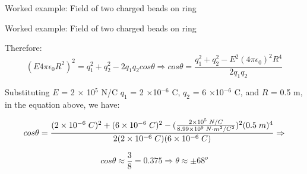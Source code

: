 {\begin{frame}{Worked example: Field of two charged beads on ring}
\end{frame}

%
%
%

\begin{frame}{Worked example: Field of two charged beads on ring}

  Therefore:
  \begin{equation*}
      (E 4\pi\epsilon_0 R^2)^2 = q_1^2 + q_2^2 - 2 q_1 q_2 cos\theta \Rightarrow
      cos\theta = \frac{q_1^2 + q_2^2 - E^2 (4\pi\epsilon_0)^2 R^4}{2 q_1 q_2}
  \end{equation*}

  Substituting
  $E$ = 2 $\times$ 10$^{5}$ N/C
  $q_1$ = 2 $\times$10$^{-6}$ C,
  $q_2$ = 6 $\times$10$^{-6}$ C, and
  $R$ = 0.5 m,
  in the equation above, we have:

  \begin{equation*}
    \small
      cos\theta =
  		  \frac{(2 \times 10^{-6} \; C)^2 + (6 \times 10^{-6} \; C)^2 -
  			      (\frac{2 \times 10^{5} \; N/C}{8.99 \times 10^{9} \; N \cdot m^2/C^2})^2 (0.5 \; m)^4}
  					 {2 (2 \times 10^{-6} \; C) (6 \times 10^{-6} \; C)} \Rightarrow
  \end{equation*}

  \begin{equation*}
  		cos\theta \approx
  			 \frac{3}{8} = 0.375 \Rightarrow
  		\theta \approx \pm 68^{o}
  \end{equation*}

\end{frame}

} %


%
%

